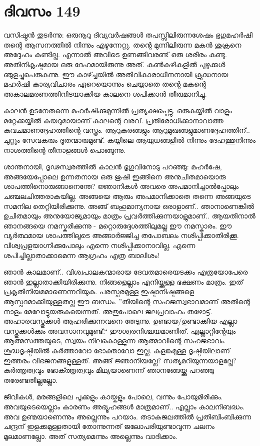 \section{ദിവസം 149}


വസിഷ്ഠൻ തുടർന്നു: ഒരുനൂറു ദിവ്യവർഷങ്ങൾ തപസ്സിലിരുന്നശേഷം ഭൃഗുമഹർഷി തന്റെ ആസനത്തിൽ നിന്നും എഴുന്നേറ്റു. തന്റെ മുന്നിലിരുന്ന മകൻ ശുക്രനെ അദ്ദേഹം കണ്ടില്ല. എന്നാൽ അവിടെ ഉണങ്ങിവരണ്ട് ഒരു ശരീരം കണ്ടു. അതിനികൃഷ്ടമായ ഒരു ദേഹമായിരുന്നു അത്. കൺകുഴികളിൽ പുഴുക്കൾ ഞുളച്ചുപെരുകുന്നു. ഈ കാഴ്ച്ചയിൽ അതിവികാരാധീനനായി ക്രുദ്ധനായ മഹർഷി കാര്യവിചാരം ഏറെയൊന്നും ചെയ്യാതെ തന്റെ മകന്റെ അകാലമരണത്തിനിടയാക്കിയ കാലനെ ശപിക്കാൻ തീരുമാനിച്ചു.

കാലൻ ഉടനേതന്നെ മഹർഷിക്കുമുന്നിൽ പ്രത്യക്ഷപ്പെട്ടു. ഒരുകയ്യിൽ വാളും മറ്റേക്കയ്യിൽ കയറുമായാണ്‌ കാലന്റെ വരവ്. പ്രതിരോധിക്കാനാവാത്ത കവചമാണദ്ദേഹത്തിന്റെ വസ്ത്രം. ആറുകരങ്ങളും ആറുമുഖങ്ങളുമാണദ്ദേഹത്തിന്‌.. ചുറ്റും സേവകരും ദൂതന്മാരുമുണ്ട്. കയ്യിലെ ആയുധങ്ങളിൽ നിന്നും ദേഹത്തുനിന്നും നാശത്തിന്റെ തീനാളങ്ങൾ പൊങ്ങുന്നു.

ശാന്തനായി, ദൃഢസ്വരത്തിൽ കാലൻ ഭൃഗുവിനോടു പറഞ്ഞു: മഹർഷേ, അങ്ങയേപ്പോലെ ഉന്നതനായ ഒരു ഋഷി ഇങ്ങിനെ അനുചിതമായൊരു  ശാപത്തിനൊരുങ്ങാനെന്തേ?  ജ്ഞാനികൾ അവരെ അപമാനിച്ചാൽപ്പോലും ചഞ്ചലചിത്തരാകയില്ല. അങ്ങയെ ആരും അപമാനിക്കാതെ തന്നെ അങ്ങയുടെ സമനില തെറ്റിയിരിക്കുന്നു. അങ്ങ് ബഹുമാന്യനായ ഒരാളാണ്‌.. ഞാനാണെങ്കില്‍  ഉചിതമായും അനുയോജ്യമായും മാത്രം പ്രവർത്തിക്കുന്നയാളുമാണ്‌.. ആയതിനാൽ ഞാനങ്ങയെ നമസ്കരിക്കുന്നു - മറ്റൊരുദ്ദേശത്തിലുമല്ല ഈ നമസ്കാരം. ഈ വ്യർത്ഥമായ ശാപത്തിലൂടെ അങ്ങാർജ്ജിച്ച തപോബലം നശിപ്പിക്കാതിരിക്കൂ. വിശ്വപ്രളയാഗ്നിക്കുപോലും എന്നെ നശിപ്പിക്കാനാവില്ല. എന്നെ ശപിച്ചില്ലാതാക്കാമെന്ന ആഗ്രഹം എത്ര ബാലിശം!

ഞാൻ കാലമാണ്‌.. വിശ്വപാലകന്മാരായ ദേവതമാരെയടക്കം എത്രയോപേരെ ഞാൻ ഇല്ലാതാക്കിയിരിക്കുന്നു. നിങ്ങളെല്ലാം എനിയ്ക്കുള്ള ഭക്ഷണം മാത്രം. ഇത് പ്രകൃതിനിയമമാണെന്നറിയുക. പരസ്പരമുള്ള ഇഷ്ടാനിഷ്ടങ്ങളെ ആസ്പദമാക്കിയുള്ളതല്ല ഈ ബന്ധം. ”തീയിന്റെ സഹജസ്വഭാവമാണ്‌ അതിന്റെ നാളം മേലോട്ടുയരുകയെന്നത്. അതുപോലെ ജലപ്രവാഹം തഴോട്ട്. അഹാരവസ്തുക്കൾ ആഹരിക്കുന്നവനെ തേടുന്നു. ഉണ്ടായ/ഉണ്ടാക്കിയ എല്ലാ വസ്തുക്കൾക്കും അവസാനവുമുണ്ട്.“ ഈശ്വരനിശ്ചയമാണിത്. എല്ലാറ്റിന്റേയും ആത്മസത്തയുടെ, സ്വയം നിലകൊള്ളുന്ന ആത്മാവിന്റെ സഹജഭാവം. ശുദ്ധദൃഷ്ടിയിൽ കർത്താവോ ഭോക്താവോ ഇല്ല. കളങ്കമുള്ള  ദൃഷ്ടിയിലാണ്‌ ഇത്തരം വിഭജനങ്ങളുള്ളത്. അങ്ങ് ജ്ഞാനിയല്ലേ? സത്യമറിയുന്നയാളല്ലേ? കർത്തൃത്വവും ഭോക്ത്തൃത്വവും മിഥ്യയാണെന്ന് ഞാനങ്ങേയ്ക്കു പറഞ്ഞു തരേണ്ടതില്ലല്ലോ.

ജീവികൾ, മരങ്ങളിലെ പൂക്കളും കായ്കളും പോലെ, വന്നും പോയുമിരിക്കും. അവയുടെയെല്ലാം കാരണം അഭ്യൂഹങ്ങൾ മാത്രമാണ്‌.. എല്ലാം കാലനിബദ്ധം. അവ ഉണ്മയാണെന്നും അല്ലെന്നും പറയാം. തടാകജലത്തിൽ പ്രതിബിംബിക്കുന്ന ചന്ദ്രന്‌ ഇളക്കമുള്ളതായി തോന്നുന്നത് ജലോപരിയുണ്ടാവുന്ന ചലനം മൂലമാണല്ലോ. അത് സത്യമെന്നും അല്ലെന്നും വാദിക്കാം. 

